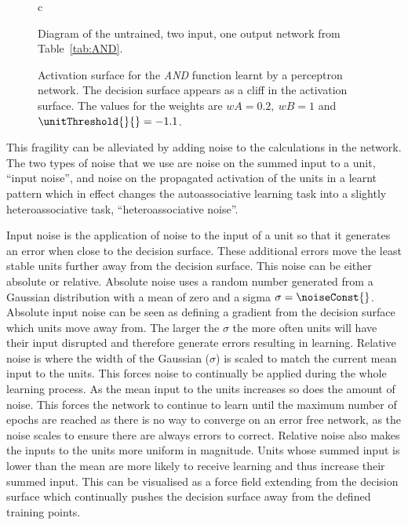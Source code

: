 \begin{figure}[hbtp]
  \center
    \begin{tabular}{c}
    \end{tabular}
    \caption{Diagram of the untrained, two input, one output network from Table~\ref{tab:AND}.} 
    \label{fig:perceptron}
\end{figure}

\begin{figure}[htbp]
 
  \begin{center}
%        
        
        \caption{Activation surface for the \emph{AND} function learnt by a perceptron network. The decision surface appears as a cliff in the activation surface.  The values for the weights are $wA=0.2,\ wB=1$ and $ \unitThreshold{}{}=-1.1$.}
        \label{fig:AND}
  \end{center}
\end{figure}

This fragility can be alleviated by adding noise to the calculations in the network.  The two types of noise that we use are noise on the summed input to a unit, ``input noise'', and noise on the propagated activation of the units in a learnt pattern which in effect changes the autoassociative learning task into a slightly heteroassociative task, ``heteroassociative noise''. 

Input noise is the application of noise to the input of a unit so that it generates an error when close to the decision surface.  These additional errors move the least stable units further away from the decision surface.  This noise can be either absolute or relative. Absolute noise uses a random number generated from a Gaussian distribution with a mean of zero and a sigma $\sigma = \noiseConst{}$.  Absolute input noise can be seen as defining a gradient from the decision surface which units move away from.  The larger the $\sigma$ the more often units will have their input disrupted and therefore generate errors resulting in learning.  Relative noise is where the width of the Gaussian ($\sigma$) is scaled to match the current mean input to the units.  This forces noise to continually be applied during the whole learning process.  As the mean input to the units increases so does the amount of noise. This forces the network to continue to learn until the maximum number of epochs are reached as there is no way to converge on an error free network, as the noise scales to ensure there are always errors to correct.  Relative noise also makes the inputs to the units more uniform in magnitude.  Units whose summed input is lower than the mean are more likely to receive learning and thus increase their summed input.  This can be visualised as a force field extending from the decision surface which continually pushes the decision surface away from the defined training points.

